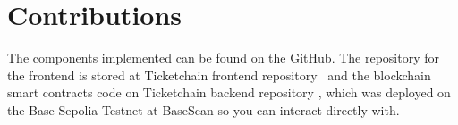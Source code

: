 \section{Contributions}
\label{sec:contributions}

The components implemented can be found on the GitHub. The repository for the
frontend is stored at Ticketchain frontend repository~\cite{frontend} and the
blockchain smart contracts code on Ticketchain backend repository
\cite{blockchain}, which was deployed on the Base Sepolia Testnet at BaseScan
\cite{basescan} so you can interact directly with.
